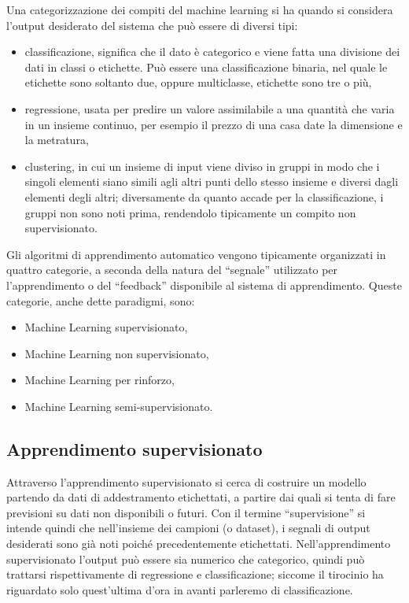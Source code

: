 \documentclass[12pt,italian]{report}
\begin{document}
Una categorizzazione dei compiti del machine learning si ha quando si considera l'output desiderato del sistema che può essere di diversi tipi:
\begin{itemize}
	\item classificazione, significa che il dato è categorico \cite{SupervisedMachineLearning} e viene fatta una divisione dei dati in classi o etichette. Può essere una classificazione binaria, nel quale le etichette sono soltanto due, oppure multiclasse, etichette sono tre o più,
	\item regressione, usata per predire un valore assimilabile a una quantità che varia in un insieme continuo, per esempio il prezzo di una casa date la dimensione e la metratura, \cite{SupervisedMachineLearning}
	\item clustering, in cui un insieme di input viene diviso in gruppi in modo che i singoli elementi siano simili agli altri punti dello stesso insieme e diversi dagli elementi degli altri; diversamente da quanto accade per la classificazione, i gruppi non sono noti prima, rendendolo tipicamente un compito non supervisionato. \cite{Introductiontodatamining}
\end{itemize}
Gli algoritmi di apprendimento automatico vengono tipicamente organizzati in quattro categorie, a seconda della natura del ``segnale'' utilizzato per l'apprendimento o del ``feedback'' disponibile al sistema di apprendimento. Queste categorie, anche dette paradigmi, sono:
\begin{itemize}
	\item Machine Learning supervisionato,
	\item Machine Learning non supervisionato,
	\item Machine Learning per rinforzo,
	\item Machine Learning semi-supervisionato.
	
\end{itemize}

\subsection{Apprendimento supervisionato}
Attraverso l’apprendimento supervisionato si cerca di costruire un modello partendo da dati di addestramento etichettati, a partire dai quali si tenta di fare previsioni su dati non disponibili o futuri. Con il termine ``supervisione'' si intende quindi che nell'insieme dei campioni (o dataset), i segnali di output desiderati sono già noti poiché precedentemente etichettati.
Nell'apprendimento supervisionato l'output può essere sia numerico che categorico, quindi può trattarsi rispettivamente di regressione e classificazione; siccome il tirocinio ha riguardato solo quest'ultima d'ora in avanti parleremo di classificazione.
\end{document}
